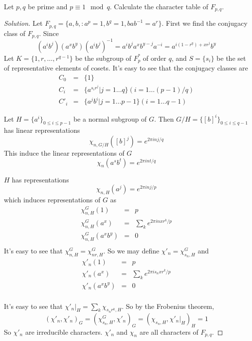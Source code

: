 \documentclass[12pt]{book}
\begin{document}
	\begin{example}
		Let $p,q$ be prime and $p\equiv 1\mod q$. Calculate the character table of $F_{p,q}$.
	\end{example}
	\begin{proof}[Solution]
		Let $F_{p,q}=\{a,b,: a^p=1,b^q=1,bab^{-1}=a^r\}$. First we find the conjugacy class of $F_{p,q}$. Since 
		\begin{equation}
			(a^ib^j)(a^xb^y)(a^ib^j)^{-1}=a^ib^ja^xb^{y-j}a^{-i}=a^{i(1-r^y)+xr^j}b^y
		\end{equation}
		Let $K=\{1,r,\dots,r^{q-1}\}$ be the subgroup of $F_p^*$ of order $q$, and $S=\{s_i\}$ be the set of representative elements of cosets. It's easy to see that the conjugacy classes are
		\begin{eqnarray}
			C_0&=&\{1\}\\
			C_i&=&\{a^{s_ir^j}|j=1\dots q\} (i=1\dots (p-1)/q)\\
			C'_i&=&\{a^{j}b^i|j=1\dots p-1\} (i=1\dots q-1)
		\end{eqnarray}
	
		Let $H=\{a^i\}_{0\leq i\leq p-1}$ be a normal subgroup of $G$. Then $G/H=\{[b]^i\}_{0\leq i\leq q-1}$ has linear representations
		\begin{equation}
			\chi_{n,G/H}([b]^j)=e^{2\pi inj/q}
		\end{equation}
		This induce the linear representations of $G$
		\begin{equation}
			\chi_{n}(a^sb^t)=e^{2\pi int/q}
		\end{equation}
		
		$H$ has representations
		\begin{equation}
			\chi_{n,H}(a^j)=e^{2\pi inj/p}
		\end{equation}
		which induces representations of $G$ as
		\begin{eqnarray}
			\chi_{n,H}^G(1)&=&p\\
			\chi_{n,H}^G(a^x)&=&\sum_k e^{2\pi inxr^k/p}\\
			\chi_{n,H}^G(a^xb^y)&=&0\\
		\end{eqnarray}
		It's easy to see that $\chi_{n,H}^G=\chi_{nr,H}^G$. So we may define $\chi'_n=\chi_{s_n,H}^G$ and
		\begin{eqnarray}
			\chi'_{n}(1)&=&p\\
			\chi'_{n}(a^x)&=&\sum_k e^{2\pi is_nxr^k/p}\\
			\chi'_{n}(a^xb^y)&=&0\\
		\end{eqnarray}
		
		It's easy to see that $\chi'_n|_H=\sum_k\chi_{s_nr^k,H}$. So by the Frobenius theorem,
		\begin{equation}
			(\chi'_n,\chi'_n)_G=(\chi_{s_n,H}^G,\chi'_n)_G=(\chi_{s_n,H},\chi'_n|_H)_H=1
		\end{equation}
		So $\chi'_n$ are irreducible characters. $\chi'_n$ and $\chi_n$ are all characters of $F_{p,q}$.
	\end{proof}
 	
\end{document}
